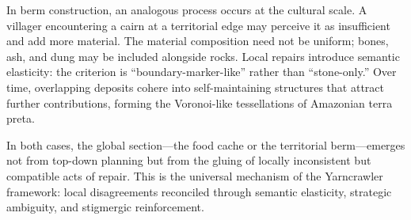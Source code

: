 In berm construction, an analogous process occurs at the cultural scale. A villager
encountering a cairn at a territorial edge may perceive it as insufficient and add
more material. The material composition need not be uniform; bones, ash, and dung
may be included alongside rocks. Local repairs introduce semantic elasticity: the
criterion is ``boundary-marker-like'' rather than ``stone-only.'' Over time,
overlapping deposits cohere into self-maintaining structures that attract further
contributions, forming the Voronoi-like tessellations of Amazonian terra preta.

In both cases, the global section---the food cache or the territorial berm---emerges
not from top-down planning but from the gluing of locally inconsistent but compatible
acts of repair. This is the universal mechanism of the Yarncrawler framework: local
disagreements reconciled through semantic elasticity, strategic ambiguity, and
stigmergic reinforcement.

